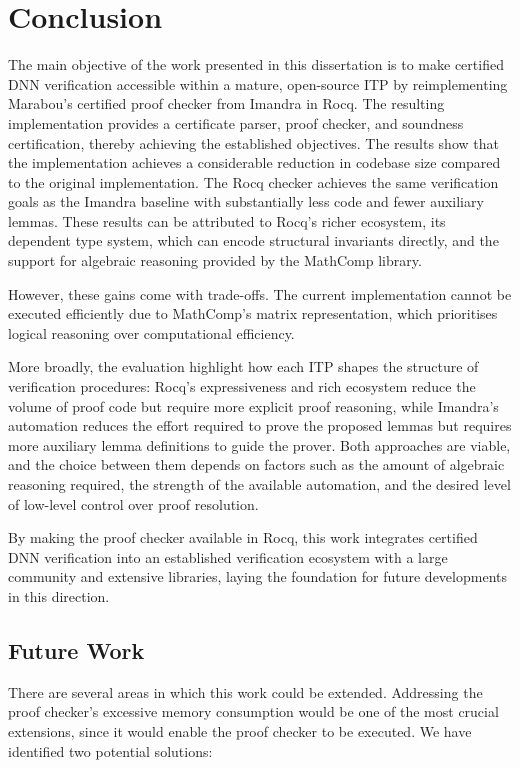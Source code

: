 \section{Conclusion} \label{sec:conclusion}

The main objective of the work presented in this dissertation is to make certified DNN verification accessible within a mature, open-source ITP by reimplementing Marabou's certified proof checker from Imandra in Rocq. The resulting implementation provides a certificate parser, proof checker, and soundness certification, thereby achieving the established objectives. The results show that the implementation achieves a considerable reduction in codebase size compared to the original implementation. The Rocq checker achieves the same verification goals as the Imandra baseline with substantially less code and fewer auxiliary lemmas. These results can be attributed to Rocq's richer ecosystem, its dependent type system, which can encode structural invariants directly, and the support for algebraic reasoning provided by the MathComp library.

However, these gains come with trade-offs. The current implementation cannot be executed efficiently due to MathComp's matrix representation, which prioritises logical reasoning over computational efficiency.

More broadly, the evaluation highlight how each ITP shapes the structure of verification procedures: Rocq's expressiveness and rich ecosystem reduce the volume of proof code but require more explicit proof reasoning, while Imandra's automation reduces the effort required to prove the proposed lemmas but requires more auxiliary lemma definitions to guide the prover. Both approaches are viable, and the choice between them depends on factors such as the amount of algebraic reasoning required, the strength of the available automation, and the desired level of low-level control over proof resolution.

By making the proof checker available in Rocq, this work integrates certified DNN verification into an established verification ecosystem with a large community and extensive libraries, laying the foundation for future developments in this direction.

\subsection{Future Work} \label{sec:future-work}

There are several areas in which this work could be extended. Addressing the proof checker's excessive memory consumption would be one of the most crucial extensions, since it would enable the proof checker to be executed. We have identified two potential solutions:

